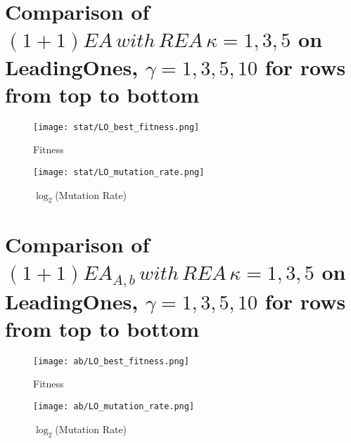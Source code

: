 \documentclass{article}
\begin{document}
\section{Comparison of $(1+1)EA\,with\,REA\,\kappa=1,3,5$ on LeadingOnes, $\gamma=1,3,5,10$ for rows from top to bottom}

\begin{figure}[H]
  \texttt{[image: stat/LO\_best\_fitness.png]}
  \caption{Fitness}
\end{figure}
\begin{figure}[H]
  \texttt{[image: stat/LO\_mutation\_rate.png]}
  \caption{$\log_2$(Mutation Rate)}
\end{figure}

\section{Comparison of $(1+1)EA_{A,b}\,with\,REA\,\kappa=1,3,5$ on LeadingOnes, $\gamma=1,3,5,10$ for rows from top to bottom}

\begin{figure}[H]
  \texttt{[image: ab/LO\_best\_fitness.png]}
  \caption{Fitness}
\end{figure}
\begin{figure}[H]
  \texttt{[image: ab/LO\_mutation\_rate.png]}
  \caption{$\log_2$(Mutation Rate)}
\end{figure}
\end{document}
